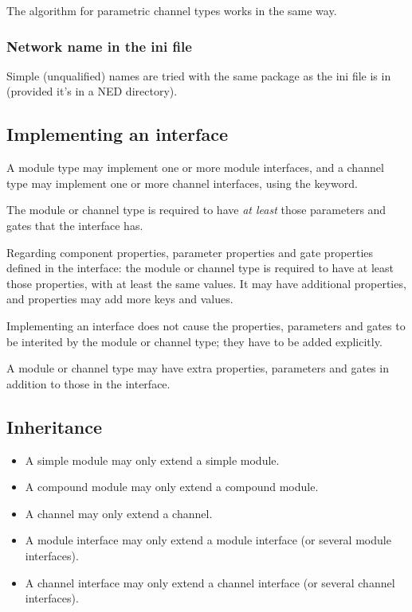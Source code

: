 The algorithm for parametric channel types works in the same way.


\subsubsection{Network name in the ini file}

Simple (unqualified) names are tried with the same package as the
ini file is in (provided it's in a NED directory).


\subsection{Implementing an interface}
\label{ch-ned-ref:sec:implementing-an-interface}

A module type may implement one or more module interfaces, and a channel type
may implement one or more channel interfaces, using the 
keyword.

The module or channel type is required to have \textit{at least} those
parameters and gates that the interface has.

Regarding component properties, parameter properties and gate properties
defined in the interface: the module or channel type is required to have at
least those properties, with at least the same values. It may have
additional properties, and properties may add more keys and values.

\begin{note}
  Implementing an interface does not cause the properties, parameters and
  gates to be interited by the module or channel type; they have to be added
  explicitly.
\end{note}

\begin{note}
  A module or channel type may have extra properties, parameters and gates
  in addition to those in the interface.
\end{note}



\subsection{Inheritance}
\label{ch-ned-ref:sec:inheritance}

\begin{itemize}
  \item A simple module may only extend a simple module.
  \item A compound module may only extend a compound module.
  \item A channel may only extend a channel.
  \item A module interface may only extend a module interface (or several module
        interfaces).
  \item A channel interface may only extend a channel interface (or several
        channel interfaces).
\end{itemize}

